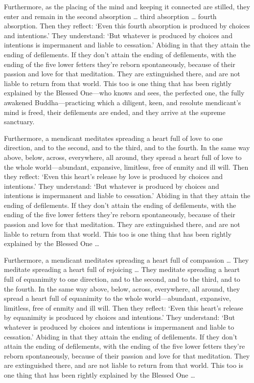 \documentclass[12pt,openany]{book}%
\begin{document}
Furthermore, as the placing of the mind and keeping it connected are stilled, they enter and remain in the second absorption … third absorption … fourth absorption. Then they reflect: ‘Even this fourth absorption is produced by choices and intentions.’ They understand: ‘But whatever is produced by choices and intentions is impermanent and liable to cessation.’ Abiding in that they attain the ending of defilements. If they don’t attain the ending of defilements, with the ending of the five lower fetters they’re reborn spontaneously, because of their passion and love for that meditation. They are extinguished there, and are not liable to return from that world. This too is one thing that has been rightly explained by the Blessed One—who knows and sees, the perfected one, the fully awakened Buddha—practicing which a diligent, keen, and resolute mendicant’s mind is freed, their defilements are ended, and they arrive at the supreme sanctuary. 

Furthermore, a mendicant meditates spreading a heart full of love to one direction, and to the second, and to the third, and to the fourth. In the same way above, below, across, everywhere, all around, they spread a heart full of love to the whole world—abundant, expansive, limitless, free of enmity and ill will. Then they reflect: ‘Even this heart’s release by love is produced by choices and intentions.’ They understand: ‘But whatever is produced by choices and intentions is impermanent and liable to cessation.’ Abiding in that they attain the ending of defilements. If they don’t attain the ending of defilements, with the ending of the five lower fetters they’re reborn spontaneously, because of their passion and love for that meditation. They are extinguished there, and are not liable to return from that world. This too is one thing that has been rightly explained by the Blessed One … 

Furthermore, a mendicant meditates spreading a heart full of compassion … They meditate spreading a heart full of rejoicing … They meditate spreading a heart full of equanimity to one direction, and to the second, and to the third, and to the fourth. In the same way above, below, across, everywhere, all around, they spread a heart full of equanimity to the whole world—abundant, expansive, limitless, free of enmity and ill will. Then they reflect: ‘Even this heart’s release by equanimity is produced by choices and intentions.’ They understand: ‘But whatever is produced by choices and intentions is impermanent and liable to cessation.’ Abiding in that they attain the ending of defilements. If they don’t attain the ending of defilements, with the ending of the five lower fetters they’re reborn spontaneously, because of their passion and love for that meditation. They are extinguished there, and are not liable to return from that world. This too is one thing that has been rightly explained by the Blessed One … 
\end{document}
